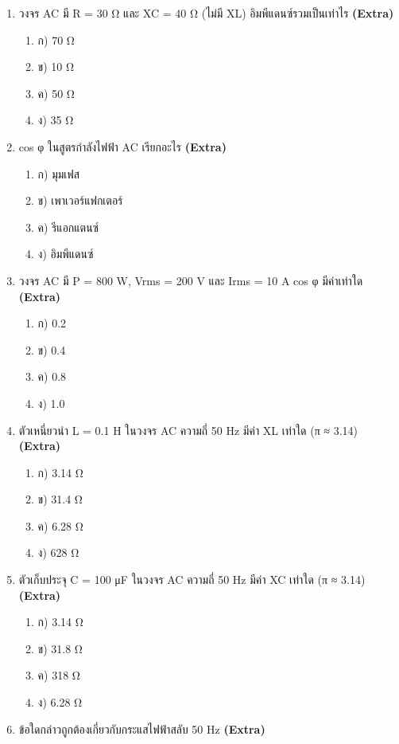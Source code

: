\documentclass[12pt]{article}
\begin{document}
\begin{enumerate}[label=\arabic*.]
\begin{enumerate}[label=)]
\item ง) วัตต์
\end{enumerate}
\item วงจร AC มี R = 30 Ω และ XC = 40 Ω (ไม่มี XL) อิมพีแดนซ์รวมเป็นเท่าไร \hfill \textbf{\small (Extra)}
\begin{enumerate}[label=)]
\item ก) 70 Ω
\item ข) 10 Ω
\item ค) 50 Ω
\item ง) 35 Ω
\end{enumerate}
\item cos φ ในสูตรกำลังไฟฟ้า AC เรียกอะไร \hfill \textbf{\small (Extra)}
\begin{enumerate}[label=)]
\item ก) มุมเฟส
\item ข) เพาเวอร์แฟกเตอร์
\item ค) รีแอกแตนซ์
\item ง) อิมพีแดนซ์
\end{enumerate}
\item วงจร AC มี P = 800 W, Vrms = 200 V และ Irms = 10 A cos φ มีค่าเท่าใด \hfill \textbf{\small (Extra)}
\begin{enumerate}[label=)]
\item ก) 0.2
\item ข) 0.4
\item ค) 0.8
\item ง) 1.0
\end{enumerate}
\item ตัวเหนี่ยวนำ L = 0.1 H ในวงจร AC ความถี่ 50 Hz มีค่า XL เท่าใด (π ≈ 3.14) \hfill \textbf{\small (Extra)}
\begin{enumerate}[label=)]
\item ก) 3.14 Ω
\item ข) 31.4 Ω
\item ค) 6.28 Ω
\item ง) 628 Ω
\end{enumerate}
\item ตัวเก็บประจุ C = 100 μF ในวงจร AC ความถี่ 50 Hz มีค่า XC เท่าใด (π ≈ 3.14) \hfill \textbf{\small (Extra)}
\begin{enumerate}[label=)]
\item ก) 3.14 Ω
\item ข) 31.8 Ω
\item ค) 318 Ω
\item ง) 6.28 Ω
\end{enumerate}
\item ข้อใดกล่าวถูกต้องเกี่ยวกับกระแสไฟฟ้าสลับ 50 Hz \hfill \textbf{\small (Extra)}

\end{enumerate}
\end{document}
